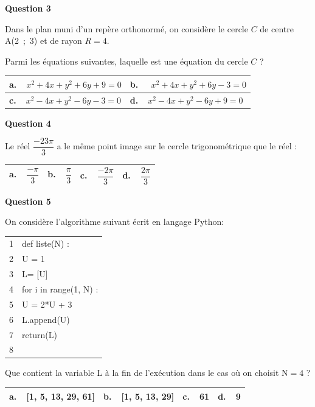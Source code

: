 \documentclass[10pt]{article}
\begin{document}
\textbf{Question 3}

\medskip

Dans le plan muni d'un repère orthonormé, on considère le cercle $C$ de centre A(2~;~3) et de rayon $R = 4$.

Parmi les équations suivantes, laquelle est une équation du cercle $C$ ?

\begin{center}
\begin{tabularx}{\linewidth}{|*{2}{X|}}\hline
\textbf{a.~~}$x^2 + 4x + y^2 + 6y + 9 = 0$&\textbf{b.~~} $x^2 + 4x + y^2 + 6y - 3 = 0$\\ \hline
\textbf{c.~~}$x^2 - 4x + y^2 - 6y - 3 = 0$&\textbf{d.~~}$x^2 - 4x + y^2 - 6y+ 9=0$\\ \hline
\end{tabularx}
\end{center}

\medskip

\textbf{Question 4}

\medskip

Le réel $\dfrac{- 23\pi}{3}$ a le même point image sur le cercle trigonométrique que le réel :

\begin{center}
\begin{tabularx}{\linewidth}{|*{4}{X|}}\hline
\textbf{a.~~}$\dfrac{-\pi}{3}$ &\textbf{b.~~}$\dfrac{\pi}{3}$&\textbf{c.~~}$\dfrac{-2\pi}{3}$ &\textbf{d.~~}$\dfrac{2\pi}{3}$\rule[-3mm]{0mm}{9mm}\\ \hline
\end{tabularx}
\end{center}

\medskip

\textbf{Question 5}

\medskip

On considère l'algorithme suivant écrit en langage Python:

\begin{center}
\begin{tabular}{|c l}
1& def liste(N) :\\
2&U = 1\\
3&L= [U]\\
4&for i in range(1, N) :\\
5&U = 2*U + 3\\
6&L.append(U)\\ 
7&return(L)\\
8&\\
\end{tabular}
\end{center}

Que contient la variable L à la fin de l'exécution dans le cas où on choisit N$ = 4$ ?

\begin{center}
\begin{tabularx}{\linewidth}{|*{4}{X|}}\hline
\textbf{a.~~}[1, 5, 13, 29, 61]&\textbf{b.~~}[1, 5, 13, 29]&\textbf{c.~~}61  &\textbf{d.~~}9\\ \hline
\end{tabularx}
\end{center}

\bigskip
\end{document}
